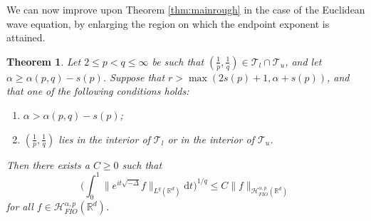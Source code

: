 \documentclass{amsart}
\numberwithin{equation}{section}
\newtheorem{theorem}{Theorem}[section]
\theoremstyle{definition}
\newcommand{\R}{\mathbb{R}}
\newcommand{\Rd}{\mathbb{R}^{d}}
\newcommand {\HT}{\mathcal{H}}
\newcommand {\ud}{\mathrm{d}}
\begin{document}
We can now improve upon Theorem \ref{thm:mainrough} in the case of the Euclidean wave equation, by enlarging the region on which the endpoint exponent is attained.

\begin{theorem}\label{thm:Euclidean}
Let $2\leq p<q\leq \infty$ be such that $(\frac{1}{p},\frac{1}{q})\in \mathcal{T}_{l}\cap \mathcal{T}_{u}$, and let $\alpha\geq \alpha(p,q)-s(p)$. Suppose that $r>\max(2s(p)+1,\alpha+s(p))$, and that one of the following conditions holds:
\begin{enumerate}
\item\label{it:Euclidean1} $\alpha>\alpha(p,q)-s(p)$; 
\item\label{it:Euclidean2} $(\frac{1}{p},\frac{1}{q})$ lies in the interior of $\mathcal{T}_{l}$ or in the interior of $\mathcal{T}_{u}$. 
\end{enumerate} 
Then there exists a $C\geq0$ such that
\begin{equation}\label{eq:Euclideanbound}
\Big(\int_{0}^{1}\|e^{it\sqrt{-\Delta}}f\|_{L^{q}(\Rd)}\ud t\Big)^{1/q}\leq C\|f\|_{\HT^{\alpha,p}_{FIO}(\R^d)}
\end{equation}
for all $f\in \HT^{\alpha,p}_{FIO}(\R^d)$.
\end{theorem}
\end{document}
